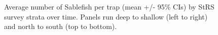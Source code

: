 \documentclass[12pt]{article}\usepackage[]{graphicx}\usepackage[]{color}
\begin{document}
\begin{figure}[htb]

{\centering {} 

}

\caption{Average number of Sablefish per trap (mean +/- 95\% CIs) by StRS survey strata over time. Panels run deep to shallow (left to right) and north to south (top to bottom).}\label{fig:figure7}
\end{figure}
\clearpage
\end{document}
